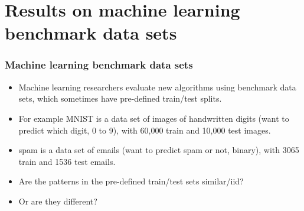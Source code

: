 \documentclass{beamer}
\begin{document}
\section{Results on machine learning benchmark data sets}

\begin{frame}
  \frametitle{Machine learning benchmark data sets}
  \begin{itemize}
  \item Machine learning researchers evaluate new algorithms using
    benchmark data sets, which sometimes have pre-defined train/test
    splits.
  \item For example MNIST is a data set of images of handwritten
    digits (want to predict which digit, 0 to 9), with 60,000 train
    and 10,000 test images.
  \item spam is a data set of emails (want to predict spam or not,
    binary), with 3065 train and 1536 test emails.
  \item Are the patterns in the pre-defined train/test sets similar/iid? 
  \item Or are they different? 
  \end{itemize}
\end{frame}
\end{document}
